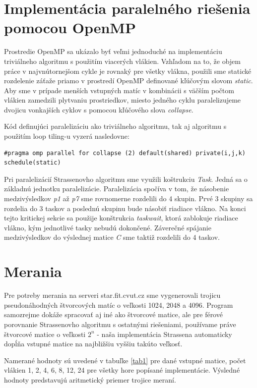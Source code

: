 \documentclass[slovak]{article}
\begin{document}
\section{Implementácia paralelného riešenia pomocou OpenMP}

Prostredie OpenMP sa ukázalo byť veľmi jednoduché na implementáciu triviálneho algoritmu s použitím viacerých vlákien. Vzhľadom na to, že objem práce v najvnútornejšom cykle je rovnaký pre všetky vlákna, použili sme statické rozdelenie záťaže priamo v prostredí OpenMP definované kľúčovým slovom \emph{static}. Aby sme v prípade menších vstupných matíc v kombinácii s väčším počtom vlákien zamedzili plytvaniu prostriedkov, miesto jedného cyklu paralelizujeme dvojicu vonkajších cyklov s pomocou kľúčového slova \emph{collapse}.

Kód definujúci paralelizáciu ako triviálneho algoritmu, tak aj algoritmu s použitím loop tiling-u vyzerá nasledovne:

\begin{verbatim}
#pragma omp parallel for collapse (2) default(shared) private(i,j,k)
schedule(static)
\end{verbatim}

Pri paralelizácií Strassenovho algoritmu sme využili koštrukciu \emph{Task}. Jedná sa o základnú jednotku paralelizácie. Paralelizácia spočíva v tom, že násobenie medzivýsledkov \emph{p1} až \emph{p7} sme rovnomerne rozdelili do 4 skupin. Prvé 3 skupiny sa rozdelia do 3 taskov a poslednú skupinu bude násobiť riadiace vlákno. Na konci tejto kritickej sekcie sa použije konštrukcia \emph{taskwait}, ktorá zablokuje riadiace vlákno, kým jednotlivé tasky nebudú dokončené. Záverečné spájanie medzivýsledkov do výslednej matice \emph{C} sme taktiž rozdelili do 4 taskov.

\section{Merania}

Pre potreby merania na serveri star.fit.cvut.cz sme vygenerovali trojicu pseudonáhodných štvorcových matíc o veľkosti 1024, 2048 a 4096. Program samozrejme dokáže spracovať aj iné ako štvorcové matice, ale pre férové porovnanie Strassenovho algoritmu s ostatnými riešeniami, používame práve štvorcové matice o veľkosti  $2^n$ - naša implementácia Strassena automaticky dopĺňa vstupné matice na najbližšiu vyššiu takúto veľkosť.

Namerané hodnoty sú uvedené v tabuľke \ref{tab1} pre dané vstupné matice, počet vlákien 1, 2, 4, 6, 8, 12, 24 pre všetky hore popísané implementácie. Výsledné hodnoty predstavujú aritmetický priemer trojice meraní.
\end{document}
